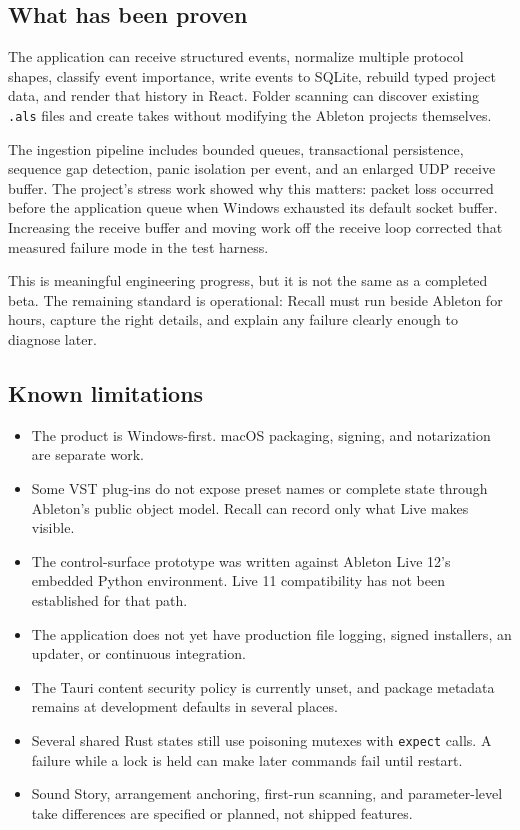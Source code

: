 \documentclass[11pt,letterpaper]{article}
\begin{document}
\subsection{What has been proven}

The application can receive structured events, normalize multiple protocol shapes,
classify event importance, write events to SQLite, rebuild typed project data, and
render that history in React. Folder scanning can discover existing \texttt{.als}
files and create takes without modifying the Ableton projects themselves.

The ingestion pipeline includes bounded queues, transactional persistence, sequence
gap detection, panic isolation per event, and an enlarged UDP receive buffer. The
project's stress work showed why this matters: packet loss occurred before the
application queue when Windows exhausted its default socket buffer. Increasing the
receive buffer and moving work off the receive loop corrected that measured failure
mode in the test harness.

This is meaningful engineering progress, but it is not the same as a completed beta.
The remaining standard is operational: Recall must run beside Ableton for hours,
capture the right details, and explain any failure clearly enough to diagnose later.

\subsection{Known limitations}

\begin{itemize}
  \item The product is Windows-first. macOS packaging, signing, and notarization are
        separate work.
  \item Some VST plug-ins do not expose preset names or complete state through Ableton's
        public object model. Recall can record only what Live makes visible.
  \item The control-surface prototype was written against Ableton Live 12's embedded
        Python environment. Live 11 compatibility has not been established for that path.
  \item The application does not yet have production file logging, signed installers,
        an updater, or continuous integration.
  \item The Tauri content security policy is currently unset, and package metadata
        remains at development defaults in several places.
  \item Several shared Rust states still use poisoning mutexes with \texttt{expect} calls.
        A failure while a lock is held can make later commands fail until restart.
  \item Sound Story, arrangement anchoring, first-run scanning, and parameter-level
        take differences are specified or planned, not shipped features.
\end{itemize}
\end{document}
